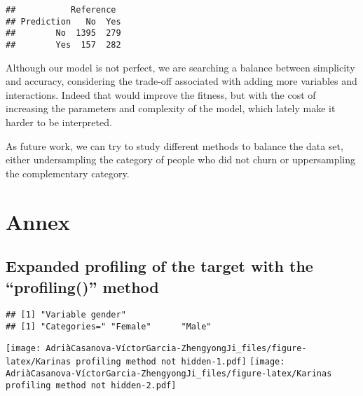 \documentclass[
]{article}
\newenvironment{Shaded}{\begin{snugshade}}{\end{snugshade}}
\newcommand{\CommentTok}[1]{\textcolor[rgb]{0.56,0.35,0.01}{\textit{#1}}}
\newcommand{\FunctionTok}[1]{\textcolor[rgb]{0.13,0.29,0.53}{\textbf{#1}}}
\newcommand{\NormalTok}[1]{#1}
\newcommand{\SpecialCharTok}[1]{\textcolor[rgb]{0.81,0.36,0.00}{\textbf{#1}}}
\newcommand{\StringTok}[1]{\textcolor[rgb]{0.31,0.60,0.02}{#1}}
\begin{document}
\begin{verbatim}
##           Reference
## Prediction   No  Yes
##        No  1395  279
##        Yes  157  282
\end{verbatim}

Although our model is not perfect, we are searching a balance between
simplicity and accuracy, considering the trade-off associated with
adding more variables and interactions. Indeed that would improve the
fitness, but with the cost of increasing the parameters and complexity
of the model, which lately make it harder to be interpreted.

As future work, we can try to study different methods to balance the
data set, either undersampling the category of people who did not churn
or uppersampling the complementary category.

\newpage

\hypertarget{annex}{%
\section{Annex}\label{annex}}

\hypertarget{expanded-profiling-of-the-target-with-the-profiling-method}{%
\subsection{Expanded profiling of the target with the ``profiling()''
method}\label{expanded-profiling-of-the-target-with-the-profiling-method}}

\begin{Shaded}
\end{Shaded}

\begin{verbatim}
## [1] "Variable gender"
## [1] "Categories=" "Female"      "Male"
\end{verbatim}

\texttt{[image: AdriàCasanova-VíctorGarcia-ZhengyongJi\_files/figure-latex/Karinas profiling method not hidden-1.pdf]}
\texttt{[image: AdriàCasanova-VíctorGarcia-ZhengyongJi\_files/figure-latex/Karinas profiling method not hidden-2.pdf]}
\end{document}

